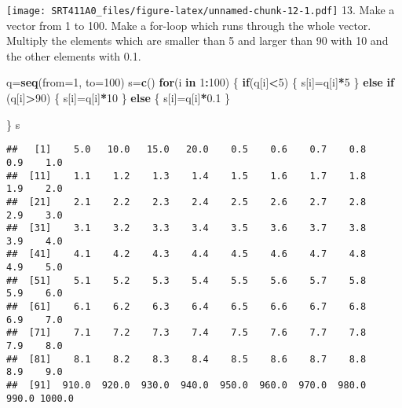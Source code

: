 \documentclass[]{article}
\newenvironment{Shaded}{\begin{snugshade}}{\end{snugshade}}
\newcommand{\KeywordTok}[1]{\textcolor[rgb]{0.13,0.29,0.53}{\textbf{#1}}}
\newcommand{\DataTypeTok}[1]{\textcolor[rgb]{0.13,0.29,0.53}{#1}}
\newcommand{\DecValTok}[1]{\textcolor[rgb]{0.00,0.00,0.81}{#1}}
\newcommand{\FloatTok}[1]{\textcolor[rgb]{0.00,0.00,0.81}{#1}}
\newcommand{\StringTok}[1]{\textcolor[rgb]{0.31,0.60,0.02}{#1}}
\newcommand{\ControlFlowTok}[1]{\textcolor[rgb]{0.13,0.29,0.53}{\textbf{#1}}}
\newcommand{\OperatorTok}[1]{\textcolor[rgb]{0.81,0.36,0.00}{\textbf{#1}}}
\newcommand{\NormalTok}[1]{#1}
\begin{document}
\begin{Shaded}
\end{Shaded}

\texttt{[image: SRT411A0\_files/figure-latex/unnamed-chunk-12-1.pdf]} 13.
Make a vector from 1 to 100. Make a for-loop which runs through the
whole vector. Multiply the elements which are smaller than 5 and larger
than 90 with 10 and the other elements with 0.1.

\begin{Shaded}
\begin{Highlighting}[]
\NormalTok{q=}\KeywordTok{seq}\NormalTok{(}\DataTypeTok{from=}\DecValTok{1}\NormalTok{, }\DataTypeTok{to=}\DecValTok{100}\NormalTok{)}
\NormalTok{s=}\KeywordTok{c}\NormalTok{()}
 \ControlFlowTok{for}\NormalTok{(i }\ControlFlowTok{in} \DecValTok{1}\OperatorTok{:}\DecValTok{100}\NormalTok{)}
\NormalTok{ \{}
   \ControlFlowTok{if}\NormalTok{(q[i]}\OperatorTok{<}\DecValTok{5}\NormalTok{)}
\NormalTok{   \{}
\NormalTok{     s[i]=q[i]}\OperatorTok{*}\DecValTok{5}
\NormalTok{   \}}
   \ControlFlowTok{else} \ControlFlowTok{if}\NormalTok{ (q[i]}\OperatorTok{>}\DecValTok{90}\NormalTok{)}
\NormalTok{   \{}
\NormalTok{     s[i]=q[i]}\OperatorTok{*}\DecValTok{10}
\NormalTok{   \}}
   \ControlFlowTok{else}
\NormalTok{   \{}
\NormalTok{     s[i]=q[i]}\OperatorTok{*}\FloatTok{0.1}
\NormalTok{   \} }
 
\NormalTok{ \}}
\NormalTok{s}
\end{Highlighting}
\end{Shaded}

\begin{verbatim}
##   [1]    5.0   10.0   15.0   20.0    0.5    0.6    0.7    0.8    0.9    1.0
##  [11]    1.1    1.2    1.3    1.4    1.5    1.6    1.7    1.8    1.9    2.0
##  [21]    2.1    2.2    2.3    2.4    2.5    2.6    2.7    2.8    2.9    3.0
##  [31]    3.1    3.2    3.3    3.4    3.5    3.6    3.7    3.8    3.9    4.0
##  [41]    4.1    4.2    4.3    4.4    4.5    4.6    4.7    4.8    4.9    5.0
##  [51]    5.1    5.2    5.3    5.4    5.5    5.6    5.7    5.8    5.9    6.0
##  [61]    6.1    6.2    6.3    6.4    6.5    6.6    6.7    6.8    6.9    7.0
##  [71]    7.1    7.2    7.3    7.4    7.5    7.6    7.7    7.8    7.9    8.0
##  [81]    8.1    8.2    8.3    8.4    8.5    8.6    8.7    8.8    8.9    9.0
##  [91]  910.0  920.0  930.0  940.0  950.0  960.0  970.0  980.0  990.0 1000.0
\end{verbatim}
\end{document}
